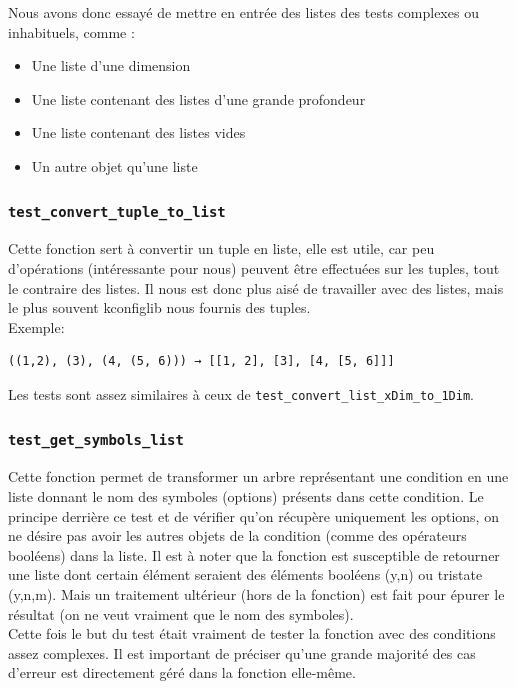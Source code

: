 \documentclass[17pts]{report}
\begin{document}
Nous avons donc essayé de mettre en entrée des listes des tests complexes ou
inhabituels, comme :
\begin{itemize}
    \item Une liste d’une dimension
    \item Une liste contenant des listes d'une grande profondeur
    \item Une liste contenant des listes vides
    \item Un autre objet qu'une liste
\end{itemize}

\subsubsection{\texttt{test\_convert\_tuple\_to\_list}}

Cette fonction sert à convertir un tuple en liste, elle est utile, car peu
d'opérations (intéressante pour nous) peuvent être effectuées sur les tuples,
tout le contraire des listes. Il nous est donc plus aisé de travailler avec des
listes, mais le plus souvent kconfiglib nous fournis des tuples.
\\
Exemple:
\begin{verbatim}
((1,2), (3), (4, (5, 6))) → [[1, 2], [3], [4, [5, 6]]]
\end{verbatim}

Les tests sont assez similaires à ceux de \verb|test_convert_list_xDim_to_1Dim|. \\


\subsubsection{\texttt{test\_get\_symbols\_list}}

Cette fonction permet de transformer un arbre représentant une condition en une
liste donnant le nom des symboles (options) présents dans cette condition. Le
principe derrière ce test et de vérifier qu'on récupère uniquement les options,
on ne désire pas avoir les autres objets de la condition (comme des opérateurs
booléens) dans la liste.  Il est à noter que la fonction est susceptible de
retourner une liste dont certain élément seraient des éléments booléens (y,n)
ou tristate (y,n,m).  Mais un traitement ultérieur (hors de la fonction) est
fait pour épurer le résultat (on ne veut vraiment que le nom des symboles).\\

Cette fois le but du test était vraiment de tester la fonction avec des
conditions assez complexes. Il est important de préciser qu'une grande majorité
des cas d'erreur est directement géré dans la fonction elle-même.\\
\end{document}
